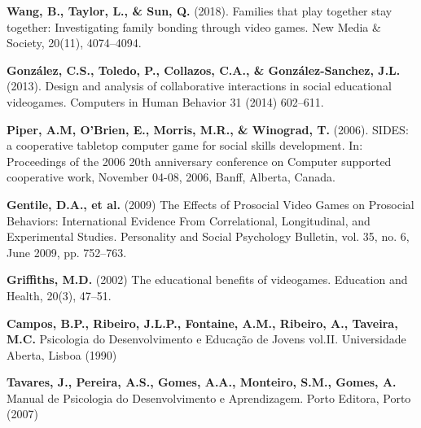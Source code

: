 \documentclass[runningheads]{llncs}
\begin{document}
\newpage
%
%
% 
% 
%
\begin{thebibliography}{8}

   \textbf{Wang, B., Taylor, L., \& Sun, Q.} (2018). Families that play together stay together: Investigating family bonding through video games. New Media \& Society, 20(11), 4074–4094. 

 \textbf{González, C.S., Toledo, P., Collazos, C.A., \& González-Sanchez, J.L.} (2013). Design and analysis of collaborative interactions in social educational videogames. Computers in Human Behavior 31 (2014) 602–611. 


 \textbf{Piper, A.M, O'Brien, E., Morris, M.R., \& Winograd, T.} (2006). SIDES: a cooperative tabletop computer game for social skills development. In: Proceedings of the 2006 20th anniversary conference on Computer supported cooperative work, November 04-08, 2006, Banff, Alberta, Canada. 

 \textbf{Gentile, D.A., et al.} (2009) The Effects of Prosocial Video Games on Prosocial Behaviors: International Evidence From Correlational, Longitudinal, and Experimental Studies. Personality and Social Psychology Bulletin, vol. 35, no. 6, June 2009, pp. 752–763. 

 \textbf{Griffiths, M.D.} (2002) The educational benefits of videogames. Education and Health, 20(3), 47–51.

 \textbf{Campos, B.P., Ribeiro, J.L.P., Fontaine, A.M., Ribeiro, A., Taveira, M.C.} Psicologia do Desenvolvimento e Educação de Jovens vol.II. Universidade Aberta, Lisboa (1990) 

 \textbf{Tavares, J., Pereira, A.S., Gomes, A.A., Monteiro, S.M., Gomes, A.} Manual de Psicologia do Desenvolvimento e Aprendizagem. Porto Editora, Porto (2007)


\end{thebibliography}
\end{document}
